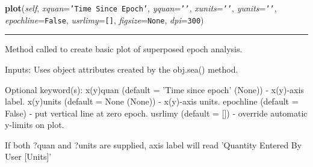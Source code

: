 \hspace{.8\funcindent}\begin{boxedminipage}{\funcwidth}

    \raggedright \textbf{plot}(\textit{self}, \textit{xquan}={\tt \texttt{'}\texttt{Time Since Epoch}\texttt{'}}, \textit{yquan}={\tt \texttt{'}\texttt{}\texttt{'}}, \textit{xunits}={\tt \texttt{'}\texttt{}\texttt{'}}, \textit{yunits}={\tt \texttt{'}\texttt{}\texttt{'}}, \textit{epochline}={\tt False}, \textit{usrlimy}={\tt \texttt{[}\texttt{]}}, \textit{figsize}={\tt None}, \textit{dpi}={\tt 300})

    \vspace{-1.5ex}

    \rule{\textwidth}{0.5\fboxrule}
\setlength{\parskip}{2ex}
    Method called to create basic plot of superposed epoch analysis.

    Inputs: Uses object attributes created by the obj.sea() method.

    Optional keyword(s): x(y)quan (default = 'Time since epoch' (None)) - 
    x(y)-axis label. x(y)units (default = None (None)) - x(y)-axis units. 
    epochline (default = False) - put vertical line at zero epoch. usrlimy 
    (default = []) - override automatic y-limits on plot.

    If both ?quan and ?units are supplied, axis label will read 'Quantity 
    Entered By User [Units]'

\setlength{\parskip}{1ex}
    \end{boxedminipage}

    \label{spacepy:seapy:Sea:plot}

    \vspace{0.5ex}

